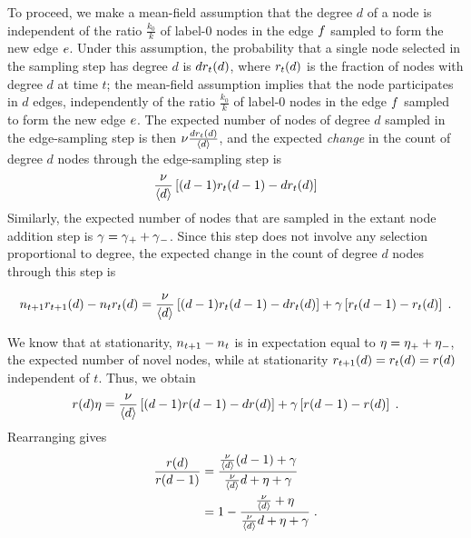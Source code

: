 \documentclass[aps,pre,reprint,superscriptaddress,nofootinbib]{revtex4-2}
\begin{document}
    To proceed, we make a mean-field assumption that the degree $d$ of a node is independent of the ratio $\frac{k_0}{k}$ of label-0 nodes in the edge $f$ sampled to form the new edge $e$.
    Under this assumption, the probability that a single node selected in the sampling step has degree $d$ is $dr_{t}(d)$, where $r_{t}(d)$ is the fraction of nodes with degree $d$ at time $t$; the mean-field assumption implies that the node participates in $d$ edges, independently of the ratio $\frac{k_0}{k}$ of label-0 nodes in the edge $f$ sampled to form the new edge $e$.
    The expected number of nodes of degree $d$ sampled in the edge-sampling step is then $\nu{} \frac{d r_{t}(d)}{\left\langle d \right\rangle}$, and the expected \emph{change} in the count of degree $d$ nodes through the edge-sampling step is 
    \begin{align}
        \frac{\nu{}}{\left\langle d \right\rangle} \left[ (d-1)r_{t}(d-1) - d r_{t}(d) \right]
    \end{align}
    Similarly, the expected number of nodes that are sampled in the extant node addition step is $\gamma{} = \gamma{}_+ + \gamma{}_-$. 
    Since this step does not involve any selection proportional to degree, the expected change in the count of degree $d$ nodes through this step is
    \begin{widetext}
        \begin{align}
            n_{t+1}r_{t+1}(d) - n_{t}r_{t}(d) = \frac{\nu{}}{\left\langle d \right\rangle} \left[ (d-1)r_{t}(d-1) - d r_{t}(d) \right] + \gamma{} \left[ r_{t}(d-1) - r_{t}(d) \right] \;.
        \end{align}
    \end{widetext}
    We know that at stationarity, $n_{t+1} - n_{t}$ is in expectation equal to $\eta{} = \eta{}_+ + \eta{}_-$, the expected number of novel nodes, while at stationarity $r_{t+1}(d) = r_{t}(d) = r(d)$ independent of $t$. 
    Thus, we obtain 
        \begin{align}
            r(d) \eta{}  = \frac{\nu{}}{\left\langle d \right\rangle} \left[ (d-1)r(d-1) - d r(d) \right] + \gamma{} \left[ r(d-1) - r(d) \right] \;.
        \end{align}
    Rearranging gives
    \begin{align}
        \frac{r(d)}{r(d-1)} &=  \frac{\frac{\nu{}}{\left\langle d \right\rangle}(d-1) + \gamma{}}{\frac{\nu{}}{\left\langle d \right\rangle} d + \eta{} + \gamma{}} \\ 
        &= 1 - \frac{\frac{\nu{}}{\left\langle d \right\rangle} + \eta{}}{\frac{\nu{}}{\left\langle d \right\rangle} d + \eta{} + \gamma{}} \;.
    \end{align}
\end{document}
